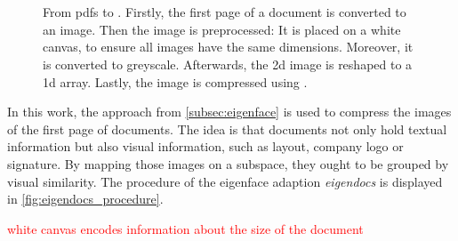 \section{\eigendocs{}}\label{subsec:eigendocs}

\begin{figure}[htp] %
    \centering
    
    \caption{From \acp{pdf} to \eigendocs{}.
    Firstly, the first page of a document is converted to an image.
    Then the image is preprocessed:
    It is placed on a white canvas, to ensure all images have the same dimensions.
    Moreover, it is converted to greyscale.
    Afterwards, the 2d image is reshaped to a 1d array.
    Lastly, the image is compressed using \eigenfaces{}.
    }
    \label{fig:eigendocs_procedure}
\end{figure}

In this work, the \eigenfaces{} approach from \autoref{subsec:eigenface} is used to compress the images of the first page of documents.
The idea is that documents not only hold textual information but also visual information, such as layout, company logo or signature.
By mapping those images on a subspace, they ought to be grouped by visual similarity.
The procedure of the eigenface adaption \textit{eigendocs} is displayed in \autoref{fig:eigendocs_procedure}.

\textcolor{red}{white canvas encodes information about the size of the document} 